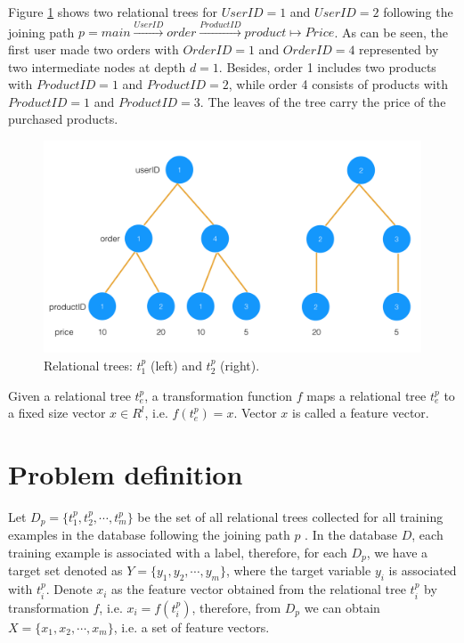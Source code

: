 \begin{example}
\label{exp:relational tree}
Figure \ref{fig:relational tree} shows two relational trees for $UserID=1$ and $UserID=2$ following the joining path $p = main \xrightarrow {UserID} order \xrightarrow {ProductID} product \mapsto Price$. As can be seen, the first user made two orders with $OrderID = 1$ and $OrderID = 4$ represented by two intermediate nodes at depth $d=1$. Besides, order 1 includes two products with $ProductID = 1$ and $ProductID = 2$, while order 4 consists of products with $ProductID = 1$ and $ProductID = 3$. The leaves of the tree carry the price of the purchased products.
\end{example}

\begin{figure}[tb]
    \centering
    \includegraphics[width=1.0\columnwidth]{./rtree.png}
    \caption{Relational trees: $t^p_1$ (left) and $t^p_2$ (right).}
    \label{fig:relational tree}
\end{figure}

\begin{definition} 
Given a relational tree $t^p_e$, a transformation function $f$ maps a relational tree $t^p_e$ to a fixed size  vector $x \in R^l$, i.e. $f(t^p_e) = x$. Vector $x$ is called a feature vector.
\end{definition}


\section{Problem definition}


Let $D_p = \{t^p_1, t^p_2, \cdots, t^p_m\}$ be the set of all relational trees collected for all training examples in the database following the joining path $p$ . In the database $D$, each training example is associated with a label, therefore, for each $D_p$,  we have a target set denoted as $Y = \{y_1, y_2, \cdots, y_m\}$, where the target variable $y_i$ is associated with $t^p_i$. Denote $x_i$ as the feature vector obtained from the relational tree $t^p_i$ by transformation $f$, i.e. $x_i = f(t^p_i)$, therefore, from $D_p$ we can obtain $X = \{x_1,x_2, \cdots, x_m\}$, i.e. a set of feature vectors.

